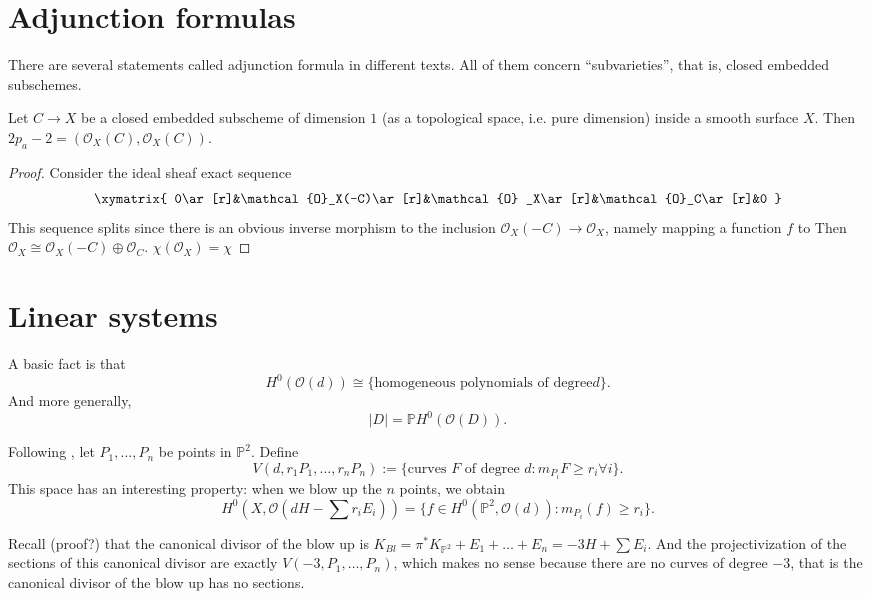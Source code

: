 \documentclass{book}
\begin{document}
\section{Adjunction formulas}
\label{section-adjunction formulas}

There are several statements called
adjunction formula
in different texts. All of them concern
``subvarieties'',
that is, closed embedded subschemes.

\begin{exercise}
\label{exercise-genus-formu-curve-surfa}
Let $C \to X$ be a closed embedded subscheme
of dimension $1$ (as a topological space,
i.e. pure dimension)
inside a smooth surface $X$.
Then
$2p_a-2=(\mathcal{O}_X(C),\mathcal{O}_X(C))$.
\end{exercise}

\begin{proof}
Consider the ideal sheaf exact sequence
$$
\xymatrix{
0\ar[r]&\mathcal{O}_X(-C)\ar[r]&\mathcal{O}
_X\ar[r]&\mathcal{O}_C\ar[r]&0
}
$$
This sequence splits since there is an
obvious inverse morphism
to the inclusion $\mathcal{O}_X(-C)\to
\mathcal{O}_X$, namely
mapping a function $f$ to
Then $\mathcal{O}_X\cong \mathcal{O}_X(-C)
\oplus \mathcal{O}_C$.
 $\chi(\mathcal{O}_X)=\chi$
\end{proof}


\section{Linear systems}
\label{section-linear-systems}

\noindent
A basic fact is that
$$
H^0(\mathcal{O}(d)) \cong
\{\text{homogeneous polynomials of degree
$d$}\}.
$$
And more generally,
$$
|D|=\mathbb{P}H^0(\mathcal{O}(D)).
$$

\medskip\noindent
Following \cite[Section 5.2]{Fulton}, let
$P_1,…,P_n$ be points in $\mathbb{P}^2$.
Define
$$
V(d,r_1P_1,…,r_nP_n):=
\{\text{curves $F$ of degree $d$}:
m_{P_i}F\geq r_i\forall i\}.
$$
This space has an interesting property:
when we blow up the $n$ points, we obtain
$$
H^0(X,\mathcal{O}(dH-\sum r_iE_i))
=
\{f \in
H^0(\mathbb{P}^2,\mathcal{O}(d)):m_{P_i}(f)
\geq  r_i\}.
$$

Recall (proof?) that the canonical divisor of
the blow up is
$K_{Bl}=\pi^* K_{\mathbb{P}^2}+E_1+…+E_n=-3H
+ \sum E_i$.
And the projectivization of the sections of
this canonical divisor
are exactly $V(-3,P_1,…,P_n)$, which makes
no sense because there are no curves of
degree $-3$,
that is the canonical divisor of the blow up
has no sections.
\end{document}
